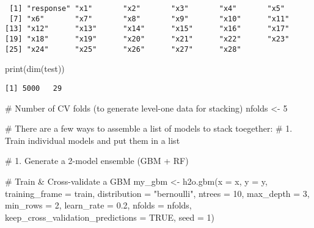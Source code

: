 \documentclass[
  letterpaper,
  DIV=11,
  numbers=noendperiod]{scrartcl}
\newenvironment{Shaded}{\begin{snugshade}}{\end{snugshade}}
\newcommand{\AttributeTok}[1]{\textcolor[rgb]{0.40,0.45,0.13}{#1}}
\newcommand{\CommentTok}[1]{\textcolor[rgb]{0.37,0.37,0.37}{#1}}
\newcommand{\ConstantTok}[1]{\textcolor[rgb]{0.56,0.35,0.01}{#1}}
\newcommand{\DecValTok}[1]{\textcolor[rgb]{0.68,0.00,0.00}{#1}}
\newcommand{\FloatTok}[1]{\textcolor[rgb]{0.68,0.00,0.00}{#1}}
\newcommand{\FunctionTok}[1]{\textcolor[rgb]{0.28,0.35,0.67}{#1}}
\newcommand{\NormalTok}[1]{\textcolor[rgb]{0.00,0.23,0.31}{#1}}
\newcommand{\OtherTok}[1]{\textcolor[rgb]{0.00,0.23,0.31}{#1}}
\newcommand{\StringTok}[1]{\textcolor[rgb]{0.13,0.47,0.30}{#1}}
\begin{document}
\begin{verbatim}
 [1] "response" "x1"       "x2"       "x3"       "x4"       "x5"      
 [7] "x6"       "x7"       "x8"       "x9"       "x10"      "x11"     
[13] "x12"      "x13"      "x14"      "x15"      "x16"      "x17"     
[19] "x18"      "x19"      "x20"      "x21"      "x22"      "x23"     
[25] "x24"      "x25"      "x26"      "x27"      "x28"     
\end{verbatim}

\begin{Shaded}
\begin{Highlighting}[]
\FunctionTok{print}\NormalTok{(}\FunctionTok{dim}\NormalTok{(test))}
\end{Highlighting}
\end{Shaded}

\begin{verbatim}
[1] 5000   29
\end{verbatim}

\begin{Shaded}
\begin{Highlighting}[]
\CommentTok{\# Number of CV folds (to generate level{-}one data for stacking)}
\NormalTok{nfolds }\OtherTok{\textless{}{-}} \DecValTok{5}

\CommentTok{\# There are a few ways to assemble a list of models to stack toegether:}
\CommentTok{\# 1. Train individual models and put them in a list}


\CommentTok{\# 1. Generate a 2{-}model ensemble (GBM + RF)}

\CommentTok{\# Train \& Cross{-}validate a GBM}
\NormalTok{my\_gbm }\OtherTok{\textless{}{-}} \FunctionTok{h2o.gbm}\NormalTok{(}\AttributeTok{x =}\NormalTok{ x,}
                  \AttributeTok{y =}\NormalTok{ y,}
                  \AttributeTok{training\_frame =}\NormalTok{ train,}
                  \AttributeTok{distribution =} \StringTok{"bernoulli"}\NormalTok{,}
                  \AttributeTok{ntrees =} \DecValTok{10}\NormalTok{,}
                  \AttributeTok{max\_depth =} \DecValTok{3}\NormalTok{,}
                  \AttributeTok{min\_rows =} \DecValTok{2}\NormalTok{,}
                  \AttributeTok{learn\_rate =} \FloatTok{0.2}\NormalTok{,}
                  \AttributeTok{nfolds =}\NormalTok{ nfolds,}
                  \AttributeTok{keep\_cross\_validation\_predictions =} \ConstantTok{TRUE}\NormalTok{,}
                  \AttributeTok{seed =} \DecValTok{1}\NormalTok{)}
\end{Highlighting}
\end{Shaded}
\end{document}
